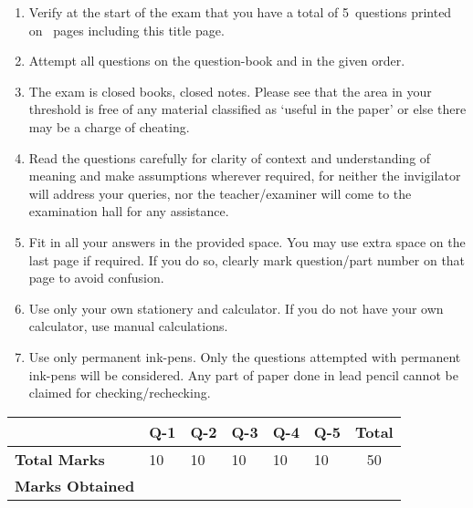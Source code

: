 \documentclass[12pt,a4paper]{article}
\newcommand\TotalMarks{50}
\newcommand\TotalQuestions{5}
\newcommand\TotalPages{\pageref{LastPage}} %
\def\Qone{10}
\def\Qtwo{10}
\def\Qthree{10}
\def\Qfour{10}
\def\Qfive{10}
\begin{document}
\begin{enumerate}
\itemsep0em
\item Verify at the start of the exam that you have a total of \TotalQuestions~questions printed on \TotalPages~pages including this title page.
\item Attempt all questions on the question-book and in the given order.
\item The exam is closed books, closed notes. Please see that the area in your threshold is free of any material classified as `useful in the paper' or else there may be a charge of cheating.
\item Read the questions carefully for clarity of context and understanding of meaning and make assumptions wherever required, for neither the invigilator will address your queries, nor the teacher/examiner will come to the examination hall for any assistance.
\item Fit in all your answers in the provided space. You may use extra space on the last page if required. If you do so, clearly mark question/part number on that page to avoid confusion. 
\item Use only your own stationery and calculator. If you do not have your own calculator, use manual calculations. 
\item Use only permanent ink-pens. Only the questions attempted with permanent ink-pens will be considered. Any part of paper done in lead pencil cannot be claimed for checking/rechecking.
\end{enumerate}
\begin{table}[H]
\begin{center}
\vspace{0.3cm}
	{\footnotesize \begin{tabular}{|C{1.8cm}|C{0.75cm}|C{0.75cm}|C{0.75cm}|C{0.75cm}|C{0.75cm}|c|}
	\hline
		\rule{0pt}{4.6ex} & Q-1 & Q-2 & Q-3 & Q-4 & Q-5 &\textbf{Total}\\[-0.5ex]
		\hline
		\rule{0pt}{2.5ex}\textbf{Total Marks}& \Qone & \Qtwo & \Qthree & \Qfour & \Qfive & \TotalMarks\\
		\hline
		\rule{0pt}{2.5ex}\textbf{Marks Obtained}& & & & & &\\
	\hline
	\end{tabular}}
\end{center}
\end{table}
\end{document}
